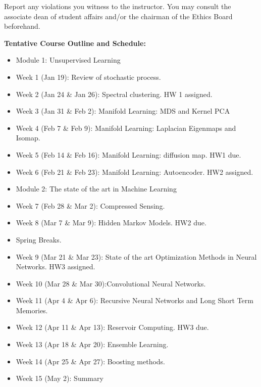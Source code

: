 \documentclass[a4paper,10pt]{article}
\begin{document}
Report any violations you witness to the instructor. You may consult the associate dean of student affairs 
and/or the chairman of the Ethics Board beforehand. 

\textbf{Tentative Course Outline and Schedule:}


\begin{itemize}
\item Module 1: Unsupervised Learning
\item Week 1 (Jan 19): Review of stochastic process.  

\item Week 2 (Jan 24 \& Jan 26): Spectral clustering. HW 1 assigned. 

\item Week 3 (Jan 31 \& Feb 2): Manifold Learning: MDS and Kernel PCA

\item Week 4 (Feb 7 \& Feb 9): Manifold Learning:  Laplacian Eigenmaps and Isomap. 

\item Week 5 (Feb 14 \& Feb 16): Manifold Learning: diffusion map. HW1 due. 

\item Week 6 (Feb 21 \& Feb 23): Manifold Learning: Autoencoder. HW2 assigned.

\item Module 2: The state of the art in Machine Learning 
\item Week 7 (Feb 28 \& Mar 2): Compressed Sensing.

\item Week 8 (Mar 7 \& Mar 9): Hidden Markov Models. HW2 due. 

\item Spring Breaks.

\item Week 9 (Mar 21 \& Mar 23): State of the art Optimization Methods in Neural Networks.
 HW3 assigned.

\item Week 10 (Mar 28 \& Mar 30):Convolutional Neural Networks. 

\item Week 11 (Apr 4 \& Apr 6):  Recursive Neural Networks and Long Short Term Memories. 

\item Week 12 (Apr 11 \& Apr 13): Reservoir Computing. HW3 due. 

\item Week 13 (Apr 18 \& Apr 20): Ensemble Learning. 

\item Week 14 (Apr 25 \& Apr 27):  Boosting methods. 

\item Week 15 (May 2): Summary 
 
\end{itemize}
\end{document}
